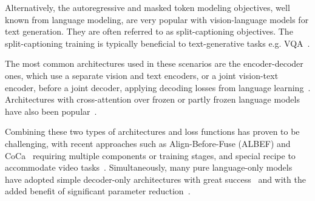 \documentclass[10pt]{article} \usepackage[accepted]{tmlr}
\begin{document}
Alternatively, the autoregressive and masked token modeling objectives, well known from language modeling, are very popular with vision-language models for text generation. They are often referred to as split-captioning objectives. 
  The split-captioning training is typically beneficial to text-generative tasks e.g. VQA~\citep{agrawal2015vqa}. 
 
The most common architectures used in these scenarios are the encoder-decoder ones, which use a separate vision and text encoders, or a joint vision-text encoder, before a joint decoder, applying decoding losses from language learning~\citep{pmlr-v139-cho21a,pali,piergiovanni2022answer,wang2021simvlm,omniVL}. Architectures with cross-attention over frozen or partly frozen language models have also been popular~\citep{flamingo}.

Combining these two types of architectures and loss functions has proven to be challenging, with recent approaches such as  Align-Before-Fuse (ALBEF) and CoCa~\citep{albef,yu2022coca,videococa} requiring multiple components or training stages, and special recipe to accommodate video tasks~\citep{videococa}. Simultaneously, many pure language-only models have adopted simple decoder-only architectures with great success~\citep{liu2018generating,gpt3,glam} and with the added benefit of significant parameter reduction~\citep{liu2018generating}.
\end{document}
